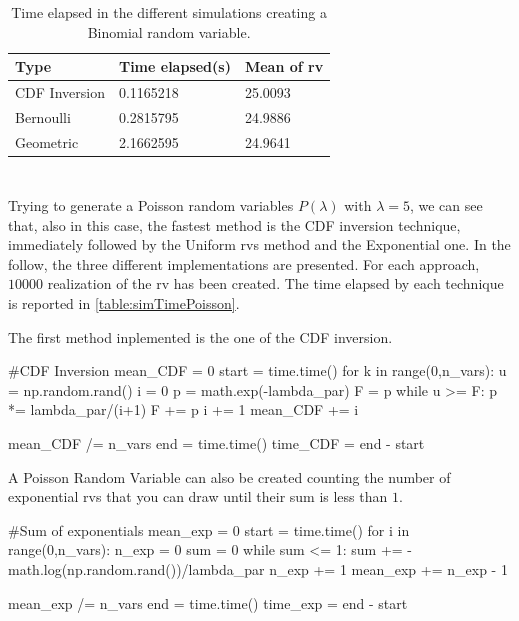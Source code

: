 \documentclass[11pt,a4paper]{article}
\begin{document}
\begin{table}[ht]
\small
	\centering
    \renewcommand{\arraystretch}{1}%
	\begin{tabular}{@{}lll@{}}
	\toprule
    Type & Time elapsed(s) & Mean of rv\\ \midrule
    CDF Inversion & 0.1165218 & 25.0093\\
    Bernoulli & 0.2815795 & 24.9886\\
    Geometric & 2.1662595 & 24.9641\\
    \bottomrule
    \end{tabular}
	\caption{Time elapsed in the different simulations creating a Binomial random variable.}
	\label{table:simTime}
\end{table}


\section{}
Trying to generate a Poisson random variables $P(\lambda)$ with $\lambda = 5$, we can see that, also in this case, the fastest method is the CDF inversion technique, immediately followed by the Uniform rvs method and the Exponential one.
In the follow, the three different implementations are presented.
For each approach, $10000$ realization of the rv has been created. The time elapsed by each technique is reported in \autoref{table:simTimePoisson}.

The first method inplemented is the one of the CDF inversion.
\begin{python}
#CDF Inversion
mean_CDF = 0
start = time.time()
for k in range(0,n_vars):
    u = np.random.rand()
    i = 0
    p = math.exp(-lambda_par)
    F = p
    while u >= F:
        p *= lambda_par/(i+1)
        F += p
        i += 1
    mean_CDF += i

mean_CDF /= n_vars
end = time.time()
time_CDF = end - start
\end{python}

A Poisson Random Variable can also be created counting the number of exponential rvs that you can draw until their sum is less than $1$.
\begin{python}
#Sum of exponentials
mean_exp = 0
start = time.time()
for i in range(0,n_vars):
    n_exp = 0
    sum = 0
    while sum <= 1:
        sum += -math.log(np.random.rand())/lambda_par
        n_exp += 1
    mean_exp += n_exp - 1

mean_exp /= n_vars
end = time.time()
time_exp = end - start
\end{python}
\end{document}
